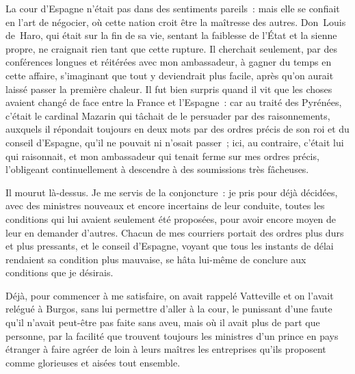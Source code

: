 \documentclass[french,twoside]{book} %
\begin{document}
La cour d’Espagne n’était pas dans des sentiments pareils : mais elle se confiait en l’art de négocier, où cette nation croit être la maîtresse des autres. Don Louis de Haro, qui était sur la fin de sa vie, sentant la faiblesse de l’État et la sienne propre, ne craignait rien tant que cette rupture. Il cherchait seulement, par des conférences longues et réitérées avec mon ambassadeur, à gagner du temps en cette affaire, s’imaginant que tout y deviendrait plus facile, après qu’on aurait laissé passer la première chaleur. Il fut bien surpris quand il vit que les choses avaient changé de face entre la France et l’Espagne : car au traité des Pyrénées, c’était le cardinal Mazarin qui tâchait de le persuader par des raisonnements, auxquels il répondait toujours en deux mots par des ordres précis de son roi et du conseil d’Espagne, qu’il ne pouvait ni n’osait passer ; ici, au contraire, c’était lui qui raisonnait, et mon ambassadeur qui tenait ferme sur mes ordres précis, l’obligeant continuellement à descendre à des soumissions très fâcheuses.\par
Il mourut là-dessus. Je me servis de la conjoncture : je pris pour déjà décidées, avec des ministres nouveaux et encore incertains de leur conduite, toutes les conditions qui lui avaient seulement été proposées, pour avoir encore moyen de leur en demander d’autres. Chacun de mes courriers portait des ordres plus durs et plus pressants, et le conseil d’Espagne, voyant que tous les instants de délai rendaient sa condition plus mauvaise, se hâta lui-même de conclure aux conditions que je désirais.\par
Déjà, pour commencer à me satisfaire, on avait rappelé Vatteville et on l’avait relégué à Burgos, sans lui permettre d’aller à la cour, le punissant d’une faute qu’il n’avait peut-être pas faite sans aveu, mais où il avait plus de part que personne, par la facilité que trouvent toujours les ministres d’un prince en pays étranger à faire agréer de loin à leurs maîtres les entreprises qu’ils proposent comme glorieuses et aisées tout ensemble.\par
\end{document}

